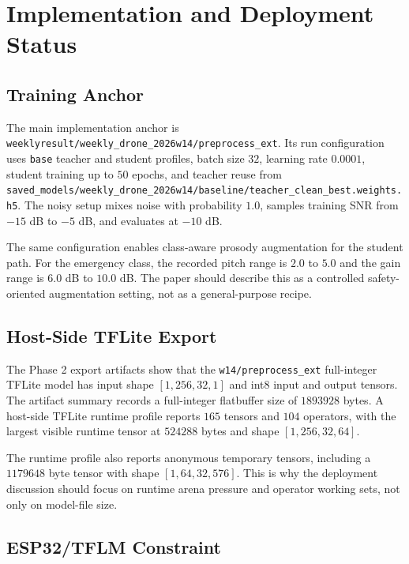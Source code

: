 \section{Implementation and Deployment Status}
\label{sec:implementation}

\subsection{Training Anchor}

The main implementation anchor is \texttt{weeklyresult/weekly\_drone\_2026w14/preprocess\_ext}. Its run configuration uses \texttt{base} teacher and student profiles, batch size $32$, learning rate $0.0001$, student training up to $50$ epochs, and teacher reuse from \texttt{saved\_models/weekly\_drone\_2026w14/baseline/teacher\_clean\_best.weights.h5}. The noisy setup mixes noise with probability $1.0$, samples training SNR from $-15$ dB to $-5$ dB, and evaluates at $-10$ dB.

The same configuration enables class-aware prosody augmentation for the student path. For the emergency class, the recorded pitch range is $2.0$ to $5.0$ and the gain range is $6.0$ dB to $10.0$ dB. The paper should describe this as a controlled safety-oriented augmentation setting, not as a general-purpose recipe.

\subsection{Host-Side TFLite Export}

The Phase 2 export artifacts show that the \texttt{w14/preprocess\_ext} full-integer TFLite model has input shape $[1,256,32,1]$ and int8 input and output tensors. The artifact summary records a full-integer flatbuffer size of $1893928$ bytes. A host-side TFLite runtime profile reports $165$ tensors and $104$ operators, with the largest visible runtime tensor at $524288$ bytes and shape $[1,256,32,64]$.

The runtime profile also reports anonymous temporary tensors, including a $1179648$ byte tensor with shape $[1,64,32,576]$. This is why the deployment discussion should focus on runtime arena pressure and operator working sets, not only on model-file size.

\subsection{ESP32/TFLM Constraint}

